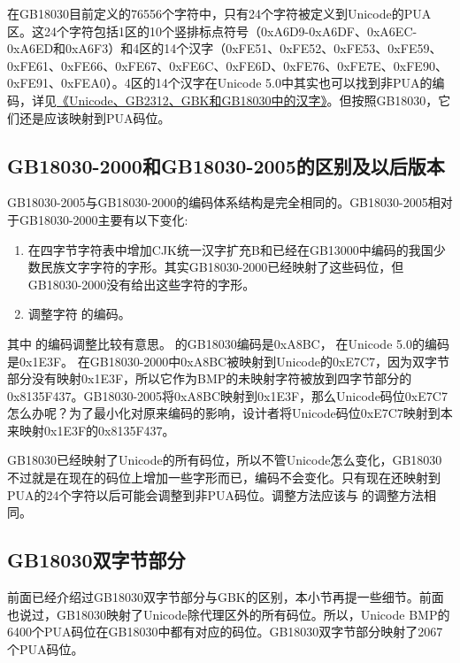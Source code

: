 \documentclass[cn,hazy,blue,14pt,screen]{elegantnote}
\begin{document}
在GB18030目前定义的76556个字符中，只有24个字符被定义到Unicode的PUA区。这24个字符包括1区的10个竖排标点符号（0xA6D9-0xA6DF、0xA6EC-0xA6ED和0xA6F3）和4区的14个汉字（0xFE51、0xFE52、0xFE53、0xFE59、0xFE61、0xFE66、0xFE67、0xFE6C、0xFE6D、0xFE76、0xFE7E、0xFE90、0xFE91、0xFEA0）。4区的14个汉字在Unicode
5.0中其实也可以找到非PUA的编码，详见\href{text24.html}{《Unicode、GB2312、GBK和GB18030中的汉字》}。但按照GB18030，它们还是应该映射到PUA码位。

\hypertarget{gb18030-2000ux548cgb18030-2005ux7684ux533aux522bux53caux4ee5ux540eux7248ux672c}{%
\subsection{GB18030-2000和GB18030-2005的区别及以后版本}\label{gb18030-2000ux548cgb18030-2005ux7684ux533aux522bux53caux4ee5ux540eux7248ux672c}}

GB18030-2005与GB18030-2000的编码体系结构是完全相同的。GB18030-2005相对于GB18030-2000主要有以下变化:

\begin{enumerate}

\item
  在四字节字符表中增加CJK统一汉字扩充B和已经在GB13000中编码的我国少数民族文字字符的字形。其实GB18030-2000已经映射了这些码位，但GB18030-2000没有给出这些字符的字形。
\item
  调整字符的编码。
\end{enumerate}

其中的编码调整比较有意思。的GB18030编码是0xA8BC，在Unicode
5.0的编码是0x1E3F。
在GB18030-2000中0xA8BC被映射到Unicode的0xE7C7，因为双字节部分没有映射0x1E3F，所以它作为BMP的未映射字符被放到四字节部分的0x8135F437。GB18030-2005将0xA8BC映射到0x1E3F，那么Unicode码位0xE7C7怎么办呢？为了最小化对原来编码的影响，设计者将Unicode码位0xE7C7映射到本来映射0x1E3F的0x8135F437。

GB18030已经映射了Unicode的所有码位，所以不管Unicode怎么变化，GB18030不过就是在现在的码位上增加一些字形而已，编码不会变化。只有现在还映射到PUA的24个字符以后可能会调整到非PUA码位。调整方法应该与的调整方法相同。

\hypertarget{gb18030ux53ccux5b57ux8282ux90e8ux5206}{%
\subsection{GB18030双字节部分}\label{gb18030ux53ccux5b57ux8282ux90e8ux5206}}

前面已经介绍过GB18030双字节部分与GBK的区别，本小节再提一些细节。前面也说过，GB18030映射了Unicode除代理区外的所有码位。所以，Unicode BMP的6400个PUA码位在GB18030中都有对应的码位。GB18030双字节部分映射了2067个PUA码位。
\end{document}
